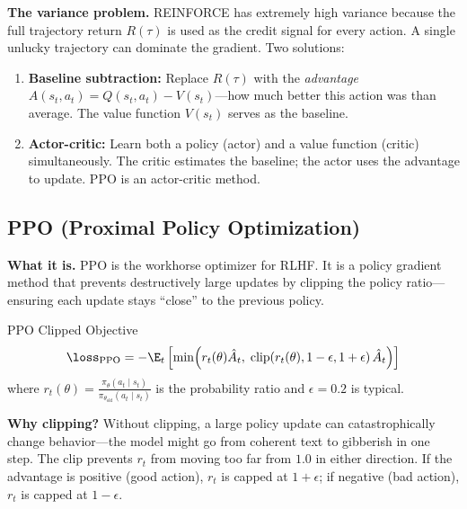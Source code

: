 \textbf{The variance problem.} REINFORCE has extremely high variance because the full trajectory return $R(\tau)$ is used as the credit signal for every action. A single unlucky trajectory can dominate the gradient. Two solutions:

\begin{enumerate}
    \item \textbf{Baseline subtraction:} Replace $R(\tau)$ with the \textit{advantage} $A(s_t, a_t) = Q(s_t, a_t) - V(s_t)$---how much better this action was than average. The value function $V(s_t)$ serves as the baseline.
    \item \textbf{Actor-critic:} Learn both a policy (actor) and a value function (critic) simultaneously. The critic estimates the baseline; the actor uses the advantage to update. PPO is an actor-critic method.
\end{enumerate}

\subsection{PPO (Proximal Policy Optimization)}

\textbf{What it is.} PPO is the workhorse optimizer for RLHF. It is a policy gradient method that prevents destructively large updates by clipping the policy ratio---ensuring each update stays ``close'' to the previous policy.

\begin{mathresult}{PPO Clipped Objective}
\begin{equation}
\loss_{\text{PPO}} = -\E_t\left[\min\!\left(r_t(\theta) \hat{A}_t,\; \text{clip}\!\left(r_t(\theta), 1-\epsilon, 1+\epsilon\right)\hat{A}_t\right)\right]
\end{equation}
where $r_t(\theta) = \frac{\pi_\theta(a_t \mid s_t)}{\pi_{\theta_{\text{old}}}(a_t \mid s_t)}$ is the probability ratio and $\epsilon = 0.2$ is typical.
\end{mathresult}

\textbf{Why clipping?} Without clipping, a large policy update can catastrophically change behavior---the model might go from coherent text to gibberish in one step. The clip prevents $r_t$ from moving too far from $1.0$ in either direction. If the advantage is positive (good action), $r_t$ is capped at $1 + \epsilon$; if negative (bad action), $r_t$ is capped at $1 - \epsilon$.

